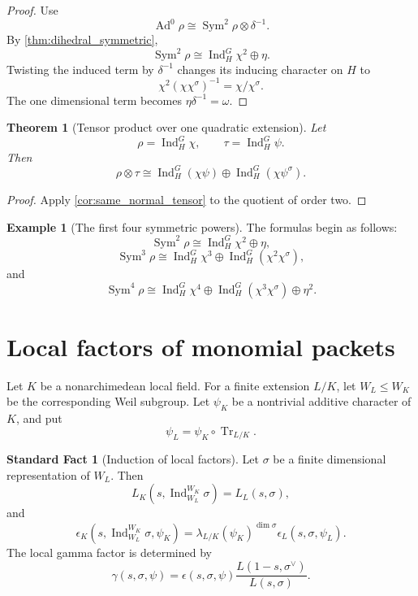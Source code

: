 \documentclass{aomart}
\newtheorem{theorem}{Theorem}[section]
\theoremstyle{definition}
\newtheorem{example}[example]{Example}
\newtheorem{standardfact}[standardfact]{Standard Fact}
\theoremstyle{remark}
\newcommand{\Ind}{\operatorname{Ind}}
\newcommand{\Sym}{\operatorname{Sym}}
\newcommand{\Tr}{\operatorname{Tr}}
\newcommand{\Ad}{\operatorname{Ad}}
\begin{document}
\begin{proof}
Use
\[
\Ad^0\rho
\cong
\Sym^2\rho\otimes\delta^{-1}.
\]
By \cref{thm:dihedral_symmetric},
\[
\Sym^2\rho
\cong
\Ind_H^G\chi^2
\oplus
\eta.
\]
Twisting the induced term by \(\delta^{-1}\) changes its inducing character on \(H\) to
\[
\chi^2(\chi\chi^\sigma)^{-1}
=
\chi/\chi^\sigma.
\]
The one dimensional term becomes \(\eta\delta^{-1}=\omega\).
\end{proof}

\begin{theorem}[Tensor product over one quadratic extension]\label{thm:dihedral_tensor}
Let
\[
\rho=\Ind_H^G\chi,
\qquad
\tau=\Ind_H^G\psi.
\]
Then
\[
\boxed{
\rho\otimes\tau
\cong
\Ind_H^G(\chi\psi)
\oplus
\Ind_H^G(\chi\psi^\sigma).
}
\]
\end{theorem}

\begin{proof}
Apply \cref{cor:same_normal_tensor} to the quotient of order two.
\end{proof}

\begin{example}[The first four symmetric powers]\label{ex:first_dihedral_powers}
The formulas begin as follows:
\[
\Sym^2\rho
\cong
\Ind_H^G\chi^2
\oplus
\eta,
\]
\[
\Sym^3\rho
\cong
\Ind_H^G\chi^3
\oplus
\Ind_H^G(\chi^2\chi^\sigma),
\]
and
\[
\Sym^4\rho
\cong
\Ind_H^G\chi^4
\oplus
\Ind_H^G(\chi^3\chi^\sigma)
\oplus
\eta^2.
\]
\end{example}

\section{Local factors of monomial packets}\label{sec:localfactors}

Let \(K\) be a nonarchimedean local field. For a finite extension \(L/K\), let \(W_L\leq W_K\) be the corresponding Weil subgroup. Let \(\psi_K\) be a nontrivial additive character of \(K\), and put
\[
\psi_L=\psi_K\circ\Tr_{L/K}.
\]

\begin{standardfact}[Induction of local factors]\label{fact:induction_local_factors}
Let \(\sigma\) be a finite dimensional representation of \(W_L\). Then
\[
L_K(s,\Ind_{W_L}^{W_K}\sigma)
=
L_L(s,\sigma),
\]
and
\[
\epsilon_K
\left(
 s,
 \Ind_{W_L}^{W_K}\sigma,
 \psi_K
\right)
=
\lambda_{L/K}(\psi_K)^{\dim\sigma}
\epsilon_L(s,\sigma,\psi_L).
\]
The local gamma factor is determined by
\[
\gamma(s,\sigma,\psi)
=
\epsilon(s,\sigma,\psi)
\frac{L(1-s,\sigma^\vee)}{L(s,\sigma)}.
\]
\end{standardfact}
\end{document}
